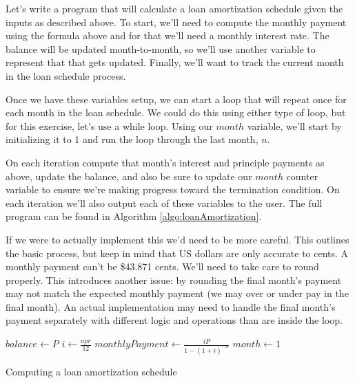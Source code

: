 Let's write a program that will calculate a loan amortization schedule given the 
inputs as described above.  To start, we'll need to compute the monthly payment
using the formula above and for that we'll need a monthly interest rate.  The
balance will be updated month-to-month, so we'll use another variable to represent
that that gets updated.  Finally, we'll want to track the current month in the loan 
schedule process.  

Once we have these variables setup, we can start a loop that will repeat once for
each month in the loan schedule.  We could do this using either type of loop, but
for this exercise, let's use a while loop.  Using our $month$ variable, we'll start by
initializing it to 1 and run the loop through the last month, $n$.  

On each iteration compute that month's interest and principle payments as above, 
update the balance, and also be sure to update our $month$ counter variable to
ensure we're making progress toward the termination condition.  On each 
iteration we'll also output each of these variables to the user.  The full 
program can be found in Algorithm \ref{algo:loanAmortization}.

If we were to actually implement this we'd need to be more careful.  This outlines
the basic process, but keep in mind that US dollars are only accurate to cents.
A monthly payment can't be \$43.871 cents.  We'll need to take care to round
properly.  This introduces another issue: by rounding the final month's payment
may not match the expected monthly payment (we may over or under pay in the 
final month).  An actual implementation may need to handle the final month's 
payment separately with different logic and operations than are inside the loop.

\begin{algorithm}[H]
$balance \leftarrow P$ 
$i \leftarrow \frac{apr}{12}$ 
$monthlyPayment \leftarrow \frac{iP}{1 - (1 + i)^{-n}} $ \;
$month \leftarrow 1$ 
\caption{Computing a loan amortization schedule}
\label{algo:loanAmortization}
\end{algorithm}



